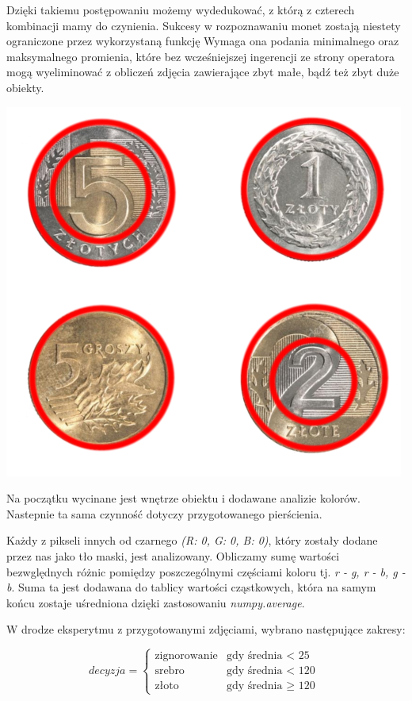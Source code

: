 \documentclass{mwart}
\begin{document}
Dzięki takiemu postępowaniu możemy wydedukować, z którą z czterech kombinacji mamy do czynienia. Sukcesy w rozpoznawaniu monet zostają niestety ograniczone przez wykorzystaną funkcję Wymaga ona podania minimalnego oraz maksymalnego promienia, które bez wcześniejszej ingerencji ze strony operatora mogą wyeliminować z obliczeń zdjęcia zawierające zbyt małe, bądź też zbyt duże obiekty.

\begin{center}
    \includegraphics[width=\textwidth]{money.png}
\end{center}

Na początku wycinane jest wnętrze obiektu i dodawane analizie kolorów. Nastepnie ta sama czynność dotyczy przygotowanego pierścienia.

Każdy z pikseli innych od czarnego \textit{(R: 0, G: 0, B: 0)}, który zostały dodane przez nas jako tło maski, jest analizowany. Obliczamy sumę wartości bezwględnych różnic pomiędzy poszczególnymi częściami koloru tj. \textit{r - g, r - b, g - b}. Suma ta jest dodawana do tablicy wartości cząstkowych, która na samym końcu zostaje uśredniona dzięki zastosowaniu \textit{numpy.average}.

W drodze eksperytmu z przygotowanymi zdjęciami, wybrano następujące zakresy:

$$
decyzja = \left\{\begin{array}{ll}
\textrm{zignorowanie} & \textrm{gdy średnia $<$ 25}\\
\textrm{srebro} & \textrm{gdy średnia $<$ 120}\\
\textrm{złoto} & \textrm{gdy średnia $\geq$ 120 }
\end{array} \right.
$$
\end{document}
